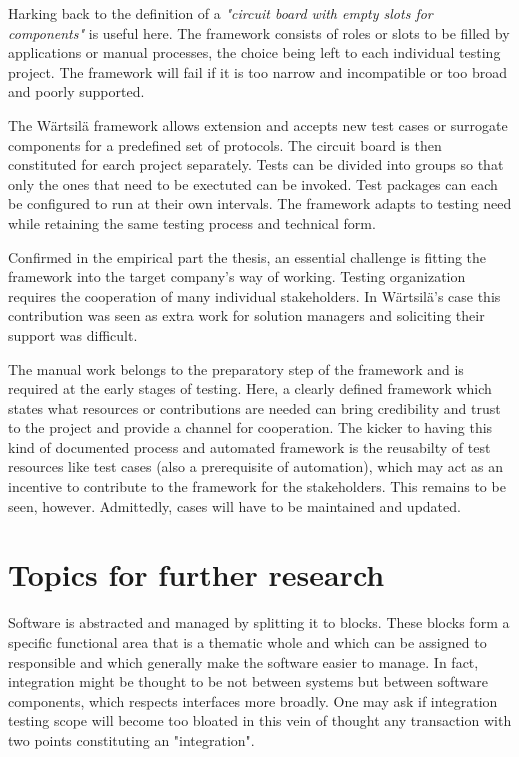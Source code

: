 \documentclass[12pt,a4paper,oneside,pdftex]{report}
\begin{document}
{Harking back to the \citep{pezze2008software} definition of a \emph{"circuit board with empty slots for components"} is useful here. The framework consists of roles or slots to be filled by applications or manual processes, the choice being left to each individual testing project. The framework will fail if it is too narrow and incompatible or too broad and poorly supported.

The Wärtsilä framework allows extension and accepts new test cases or surrogate components for a predefined set of protocols. The circuit board is then constituted for earch project separately. Tests can be divided into groups so that only the ones that need to be exectuted can be invoked. Test packages can each be configured to run at their own intervals. The framework adapts to testing need while retaining the same testing process and technical form.

Confirmed in the empirical part the thesis, an essential challenge is fitting the framework into the target company's way of working. Testing organization requires the cooperation of many individual stakeholders. In Wärtsilä's case this contribution was seen as extra work for solution managers and soliciting their support was difficult. 

The manual work belongs to the preparatory step of the framework and is required at the early stages of testing. Here, a clearly defined framework which states what resources or contributions are needed can bring credibility and trust to the project and provide a channel for cooperation. The kicker to having this kind of documented process and automated framework is the reusabilty of test resources like test cases (also a prerequisite of automation), which may act as an incentive to contribute to the framework for the stakeholders. This remains to be seen, however. Admittedly, cases will have to be maintained and updated.


\section{Topics for further research}

Software is abstracted and managed by splitting it to blocks. These blocks form a specific functional area that is a thematic whole and which can be assigned to responsible and which generally make the software easier to manage. In fact, integration might be thought to be not between systems but between software components, which respects interfaces more broadly. One may ask if integration testing scope will become too bloated in this vein of thought any transaction with two points constituting an "integration".

}
\end{document}
